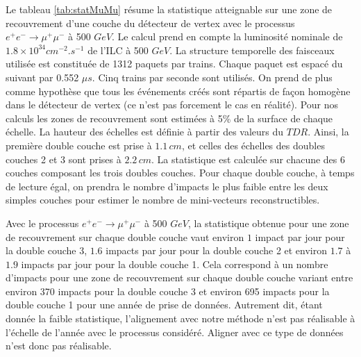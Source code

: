   Le tableau \ref{tab:statMuMu} r\'esume la statistique atteignable sur une zone de recouvrement d'une couche du d\'etecteur de vertex avec le processus $e^+ e^- \rightarrow \mu^+ \mu^-$ \`a 500 $GeV$. Le calcul prend en compte la luminosit\'e nominale de $1.8 \times 10^{34} cm^{-2}.s^{-1}$ de l'ILC \`a 500 $GeV$. La structure temporelle des faisceaux utilis\'ee est constitu\'ee de 1312 paquets par trains. Chaque paquet est espac\'e du suivant par 0.552 $\mu s$. Cinq trains par seconde sont utilis\'es. On prend de plus comme hypoth\`ese que tous les \'ev\'enements cr\'e\'es sont r\'epartis de fa\c{c}on homog\`ene dans le d\'etecteur de vertex (ce n'est pas forcement le cas en r\'ealit\'e). Pour nos calculs les zones de recouvrement sont estim\'ees \`a 5\% de la surface de chaque \'echelle. La hauteur des \'echelles est d\'efinie \`a partir des valeurs du $TDR$. Ainsi, la premi\`ere double couche est prise \`a $1.1 \, cm$, et celles des \'echelles des doubles couches 2 et 3 sont prises \`a $2.2 \, cm$. La statistique est calcul\'ee sur chacune des 6 couches composant les trois doubles couches. Pour chaque double couche, \`a temps de lecture \'egal, on prendra le nombre d'impacts le plus faible entre les deux simples couches pour estimer le nombre de mini-vecteurs reconstructibles.
  
  \medskip
  
  Avec le processus $e^+ e^- \rightarrow \mu^+ \mu^-$ \`a 500 $GeV$, la statistique obtenue pour une zone de recouvrement sur chaque double couche vaut environ $1$ impact par jour pour la double couche 3, $1.6$ impacts par jour pour la double couche 2  et environ $1.7$ \`a $1.9$ impacts par jour pour la double couche 1. Cela correspond \`a un nombre d'impacts pour une zone de recouvrement sur chaque double couche variant entre environ 370 impacts pour la double couche 3 et environ 695 impacts pour la double couche 1 pour une ann\'ee de prise de donn\'ees. Autrement dit, \'etant donn\'ee la faible statistique, l'alignement avec notre m\'ethode n'est pas r\'ealisable \`a l'\'echelle de l'ann\'ee avec le processus consid\'er\'e. Aligner avec ce type de donn\'ees n'est donc pas r\'ealisable.
  
  \medskip
  

